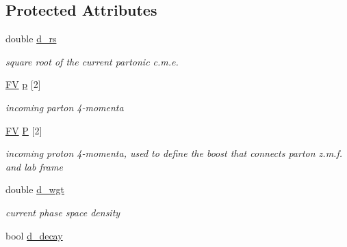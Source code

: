 \subsection*{Protected Attributes}
\begin{DoxyCompactItemize}
\item 
\hypertarget{classPS__2_a20ee7f6afb71183f2f61c7049b2e1c9e}{double \hyperlink{classPS__2_a20ee7f6afb71183f2f61c7049b2e1c9e}{d\-\_\-rs}}\label{classPS__2_a20ee7f6afb71183f2f61c7049b2e1c9e}

\begin{DoxyCompactList}\small\item\em square root of the current partonic c.\-m.\-e. \end{DoxyCompactList}\item 
\hypertarget{classPS__2_ac717630d614c3bce592b1d0ba1d969c7}{\hyperlink{classFV}{F\-V} \hyperlink{classPS__2_ac717630d614c3bce592b1d0ba1d969c7}{p} \mbox{[}2\mbox{]}}\label{classPS__2_ac717630d614c3bce592b1d0ba1d969c7}

\begin{DoxyCompactList}\small\item\em incoming parton 4-\/momenta \end{DoxyCompactList}\item 
\hypertarget{classPS__2_a9c8c1bd53ef9086e96705be1377564ec}{\hyperlink{classFV}{F\-V} \hyperlink{classPS__2_a9c8c1bd53ef9086e96705be1377564ec}{P} \mbox{[}2\mbox{]}}\label{classPS__2_a9c8c1bd53ef9086e96705be1377564ec}

\begin{DoxyCompactList}\small\item\em incoming proton 4-\/momenta, used to define the boost that connects parton z.\-m.\-f. and lab frame \end{DoxyCompactList}\item 
\hypertarget{classPS__2_a7840687732819d92810f9a2666621650}{double \hyperlink{classPS__2_a7840687732819d92810f9a2666621650}{d\-\_\-wgt}}\label{classPS__2_a7840687732819d92810f9a2666621650}

\begin{DoxyCompactList}\small\item\em current phase space density \end{DoxyCompactList}\item 
\hypertarget{classPS__2_a973be656af67bb3516424e664a49ae55}{bool \hyperlink{classPS__2_a973be656af67bb3516424e664a49ae55}{d\-\_\-decay}}\label{classPS__2_a973be656af67bb3516424e664a49ae55}


\end{DoxyCompactItemize}
